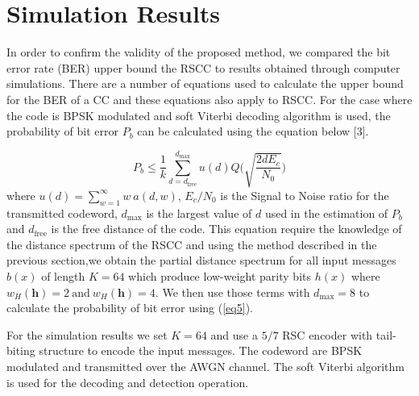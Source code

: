\documentclass[conference]{IEEEtran}
\begin{document}
\section{Simulation Results}
\label{sec5}

In order to confirm the validity of the proposed method, we compared the bit error rate (BER) upper bound the RSCC to results obtained through computer simulations. 
There are a number of equations used to calculate the upper bound for the BER of a CC and these equations also apply to RSCC. For the case where the code is BPSK modulated and soft Viterbi decoding algorithm is used, the probability of bit error $P_b$ can be calculated using the equation below [3].

\begin{equation}
P_b \leq \frac{1}{k} \sum_{d=d_{\text{free}}}^{d_{\text{max}}} u(d) Q\Bigg( \sqrt{\frac{2dE_c}{N_0}}\Bigg)
\label{eq5}
\end{equation}
where $u(d)=\sum_{w=1}^{\infty} w~ a(d,w)$,  $E_c/N_0$ is the Signal to Noise ratio for the transmitted codeword, $d_{\text{max}}$ is the largest value of $d$ used in the estimation of $P_b$ and $d_{\text{free}}$ is the free distance of the code. This equation require the knowledge of the distance spectrum of the RSCC and using the method described in the previous section,we obtain the partial distance spectrum for all input messages $b(x)$ of length $K=64$ which produce low-weight parity bits
$h(x)$ where $w_H(\textbf{h})=2 ~\text{and} ~ w_H(\textbf{h})=4$.  We then use those terms with $d_{\text{max}}=8$ to calculate the probability of bit error using (\ref{eq5}). 

For the simulation results we set $K=64$ and use a $5/7$ RSC encoder with tail-biting structure to encode the input messages. The codeword are BPSK modulated and transmitted over the AWGN channel. The soft Viterbi algorithm is used for the decoding and detection operation.
\end{document}
